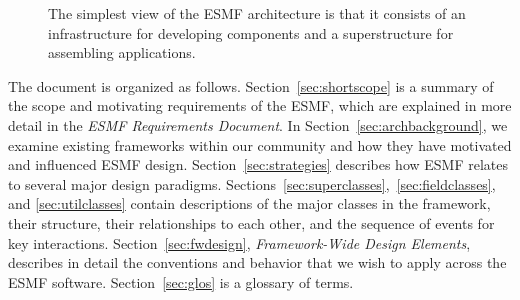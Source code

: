 \begin{figure}
\label{fig:sandwich}
\caption[{ESMF Architecture}]{The simplest view of the ESMF architecture
is that it consists of an infrastructure for developing components and 
a superstructure for assembling applications.}
\end{figure}

The document is organized as follows.  Section~\ref{sec:shortscope} is a summary of the 
scope and motivating requirements of the ESMF, which are explained in more detail in 
the {\it ESMF Requirements Document}.  In Section~\ref{sec:archbackground}, 
we examine existing frameworks within our community and how they have motivated
and influenced ESMF design.  
Section~\ref{sec:strategies} describes how ESMF relates to several
major design paradigms.
Sections~\ref{sec:superclasses},~\ref{sec:fieldclasses}, and
\ref{sec:utilclasses} contain descriptions of the 
major classes in the framework, their structure, their relationships to each other, 
and the sequence of events for key interactions.  Section~\ref{sec:fwdesign}, {\it 
Framework-Wide Design Elements}, describes in detail the conventions and behavior
that we wish to apply across the ESMF software.  Section~\ref{sec:glos} is a 
glossary of terms.








